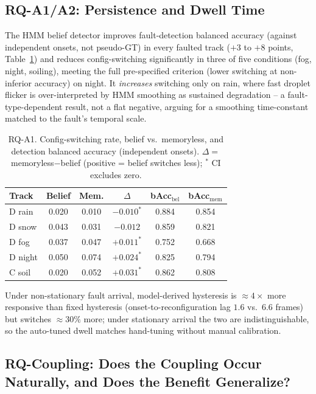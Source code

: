 \documentclass[conference]{IEEEtran}
\begin{document}
\subsection{RQ-A1/A2: Persistence and Dwell Time}

The HMM belief detector improves fault-detection balanced accuracy
(against independent onsets, not pseudo-GT) in every faulted track
($+3$ to $+8$ points, Table~\ref{tab:rqa1}) and reduces
config-switching significantly in three of five conditions (fog,
night, soiling), meeting the full pre-specified criterion (lower
switching at non-inferior accuracy) on night. It \emph{increases}
switching only on rain, where fast droplet flicker is
over-interpreted by HMM smoothing as sustained degradation -- a
fault-type-dependent result, not a flat negative, arguing for a
smoothing time-constant matched to the fault's temporal scale.

\begin{table}[htbp]
\caption{RQ-A1. Config-switching rate, belief vs.\ memoryless, and
detection balanced accuracy (independent onsets). $\Delta=$
memoryless$-$belief (positive = belief switches less); $^\ast$ CI
excludes zero.}
\label{tab:rqa1}
\centering
\footnotesize
\setlength{\tabcolsep}{3pt}
\begin{tabular}{lccccc}
\toprule
\textbf{Track} & \textbf{Belief} & \textbf{Mem.} &
\textbf{$\Delta$} & \textbf{bAcc$_{\text{bel}}$} & \textbf{bAcc$_{\text{mem}}$} \\
\midrule
D rain   & 0.020 & 0.010 & $-0.010^\ast$ & 0.884 & 0.854 \\
D snow   & 0.043 & 0.031 & $-0.012$      & 0.859 & 0.821 \\
D fog    & 0.037 & 0.047 & $+0.011^\ast$ & 0.752 & 0.668 \\
D night  & 0.050 & 0.074 & $+0.024^\ast$ & 0.825 & 0.794 \\
C soil   & 0.020 & 0.052 & $+0.031^\ast$ & 0.862 & 0.808 \\
\bottomrule
\end{tabular}
\end{table}

Under non-stationary fault arrival, model-derived hysteresis is
$\approx\!4\times$ more responsive than fixed hysteresis
(onset-to-reconfiguration lag $1.6$ vs.\ $6.6$ frames) but switches
$\approx\!30\%$ more; under stationary arrival the two are
indistinguishable, so the auto-tuned dwell matches hand-tuning
without manual calibration.

\subsection{RQ-Coupling: Does the Coupling Occur Naturally, and Does the Benefit Generalize?}
\label{sec:rqcoupling}
\end{document}
